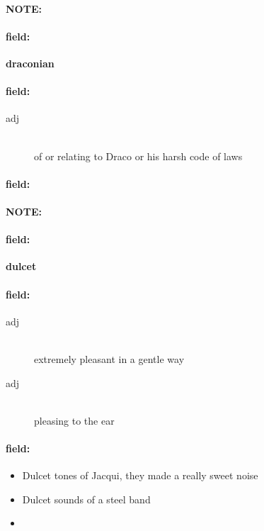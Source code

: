 \documentclass[12pt]{article}
\newenvironment{note}{\paragraph{NOTE:}}{}
\newenvironment{field}{\paragraph{field:}}{}
\begin{document}
\begin{note}
\begin{field}
\textbf{\large draconian}
\end{field}


\begin{field}
\begin{description}
\item[adj] \hfill \\ 
of or relating to Draco or his harsh code of laws

\end{description}
\end{field}

\begin{field}
\end{field}
\end{note}
\begin{note}
\begin{field}
\textbf{\large dulcet}
\end{field}


\begin{field}
\begin{description}
\item[adj] \hfill \\ 
extremely pleasant in a gentle way

\item[adj] \hfill \\ 
pleasing to the ear

\end{description}
\end{field}

\begin{field}
\begin{itemize}
\item Dulcet tones of Jacqui, they made a really sweet noise
\item Dulcet sounds of a steel band
\item 
\end{itemize}
\end{field}
\end{note}
\end{document}
